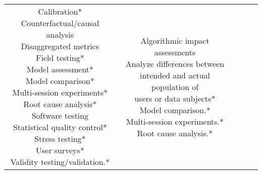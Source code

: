 \documentclass[fleqn]{article}
\begin{document}
\begin{landscape}
\begin{table}[H]
\begin{tabular}{|c|c|c|c|c|}
{			\textbullet\hspace{3pt} Calibration*\\  	
			\textbullet\hspace{3pt} Counterfactual/causal analysis\\  	
			\textbullet\hspace{3pt} Disaggregated metrics\\  	
			\textbullet\hspace{3pt} Field testing*\\  	
			\textbullet\hspace{3pt} Model assessment*\\  	
			\textbullet\hspace{3pt} Model comparison*\\  	
			\textbullet\hspace{3pt} Multi-session experiments*\\  	
			\textbullet\hspace{3pt} Root cause analysis*\\  	
			\textbullet\hspace{3pt} Software testing\\  	
			\textbullet\hspace{3pt} Statistical quality control*\\  	
			\textbullet\hspace{3pt} Stress testing*\\  		
			\textbullet\hspace{3pt} User surveys*\\  		
			\textbullet\hspace{3pt} Validity testing/validation.*
		}
		&
		\makecell[l]{ 	
			\textbullet\hspace{3pt} Algorithmic impact assessments \\
			\textbullet\hspace{3pt} Analyze differences between \\\hspace{10pt}intended and actual population of \\\hspace{10pt}users or data subjects*\\ 
			\textbullet\hspace{3pt} Model comparison.* \\
			\textbullet\hspace{3pt} Multi-session experiments.* \\	
			\textbullet\hspace{3pt} Root cause analysis.* \\			
}
\end{tabular}
\end{table}
\end{landscape}
\end{document}
